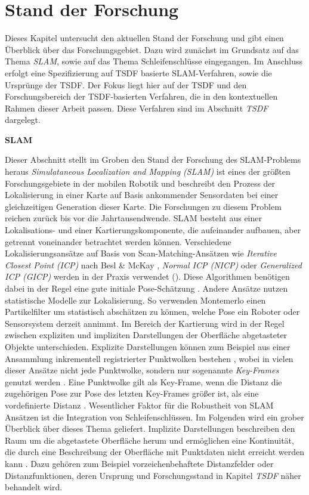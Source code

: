 \chapter{Stand der Forschung}\label{chapter:sdf}

Dieses Kapitel untersucht den aktuellen Stand der Forschung und gibt einen Überblick über das Forschungsgebiet. Dazu wird zunächst im Grundsatz auf das Thema \emph{SLAM}, sowie auf das Thema Schleifenschlüsse eingegangen. Im Anschluss erfolgt eine Spezifizierung auf TSDF basierte SLAM-Verfahren, sowie die Ursprünge der TSDF. Der Fokus liegt hier auf der TSDF und den Forschungsbereich der TSDF-basierten Verfahren, die in den kontextuellen Rahmen dieser Arbeit passen. Diese Verfahren sind im Abschnitt \emph{TSDF} dargelegt.

\textbf{SLAM}

Dieser Abschnitt stellt im Groben den Stand der Forschung des SLAM-Problems heraus
\textit{Simulataneous Localization and Mapping (SLAM)} ist eines der größten Forschungsgebiete in der mobilen Robotik \cite{cadena2016past} und beschreibt den Prozess der Lokalisierung in einer Karte auf Basis ankommender Sensordaten bei einer gleichzeitigen Generation dieser Karte. Die Forschungen zu diesem Problem reichen zurück bis vor die Jahrtausendwende. SLAM besteht aus einer Lokalisations- und einer Kartierungskomponente, die aufeinander aufbauen, aber getrennt voneinander betrachtet werden können. Verschiedene Lokalisierungsansätze auf Basis von Scan-Matching-Ansätzen wie \emph{Iterative Closest Point (ICP)} nach Besl \& McKay \cite{besl1992method}, \emph{Normal ICP (NICP)} \cite{chen1992object} oder \emph{Generalized ICP (GICP)} \cite{segal2009generalized} werden in der Praxis verwendet (\cite{shan2020lio, izadi2011kinectfusion}). Diese Algorithmen benötigen dabei in der Regel eine gute initiale Pose-Schätzung \cite{he2017iterative}. Andere Ansätze nutzen statistische Modelle zur Lokalisierung. So verwenden Montemerlo \cite{montemerlo2002fastslam, montemerlo2003fastslam} einen Partikelfilter um statistisch abschätzen zu können, welche Pose ein Roboter oder Sensorsystem derzeit annimmt. Im Bereich der Kartierung wird in der Regel zwischen expliziten und impliziten Darstellungen der Oberfläche abgetasteter Objekte unterschieden. Explizite Darstellungen können zum Beispiel aus einer Ansammlung inkrementell registrierter Punktwolken bestehen \cite{izadi2011kinectfusion}, wobei in vielen dieser Ansätze nicht jede Punktwolke, sondern nur sogenannte \emph{Key-Frames} genutzt werden \cite{shan2020lio}. Eine Punktwolke gilt als Key-Frame, wenn die Distanz die zugehörigen Pose zur Pose des letzten Key-Frames größer ist, als eine vordefinierte Distanz \cite{shan2020lio}.
Wesentlicher Faktor für die Robustheit von SLAM Ansätzen ist die Integration von Schleifenschlüssen. Im Folgenden wird ein grober Überblick über dieses Thema geliefert. Implizite Darstellungen beschreiben den Raum um die abgetastete Oberfläche herum und ermöglichen eine Kontinuität, die durch eine Beschreibung der Oberfläche mit Punktdaten nicht erreicht werden kann \cite{curless1996volumetric}. Dazu gehören zum Beispiel vorzeichenbehaftete Distanzfelder oder Distanzfunktionen, deren Ursprung und Forschungsstand in Kapitel \emph{TSDF} näher behandelt wird. 

